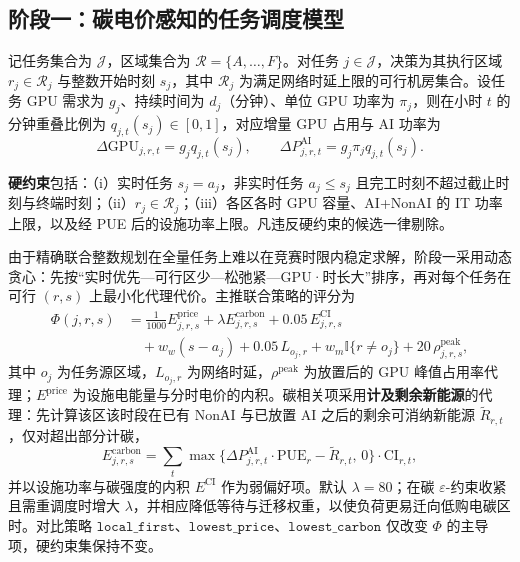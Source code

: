 \subsection{阶段一：碳电价感知的任务调度模型}

记任务集合为 \(\mathcal{J}\)，区域集合为 \(\mathcal{R}=\{A,\ldots,F\}\)。对任务 \(j\in\mathcal{J}\)，决策为其执行区域 \(r_j\in\mathcal{R}_j\) 与整数开始时刻 \(s_j\)，其中 \(\mathcal{R}_j\) 为满足网络时延上限的可行机房集合。设任务 GPU 需求为 \(g_j\)、持续时间为 \(d_j\)（分钟）、单位 GPU 功率为 \(\pi_j\)，则在小时 \(t\) 的分钟重叠比例为 \(q_{j,t}(s_j)\in[0,1]\)，对应增量 GPU 占用与 AI 功率为
\begin{equation}
\Delta\mathrm{GPU}_{j,r,t}
=
g_j q_{j,t}(s_j),\qquad
\Delta P^{\mathrm{AI}}_{j,r,t}
=
g_j\pi_j q_{j,t}(s_j).
\end{equation}

\textbf{硬约束}包括：（i）实时任务 \(s_j=a_j\)，非实时任务 \(a_j\le s_j\) 且完工时刻不超过截止时刻与终端时刻；（ii）\(r_j\in\mathcal{R}_j\)；（iii）各区各时 GPU 容量、AI+NonAI 的 IT 功率上限，以及经 PUE 后的设施功率上限。凡违反硬约束的候选一律剔除。

由于精确联合整数规划在全量任务上难以在竞赛时限内稳定求解，阶段一采用动态贪心：先按“实时优先—可行区少—松弛紧—GPU·时长大”排序，再对每个任务在可行 \((r,s)\) 上最小化代理代价。主推联合策略的评分为
\begin{equation}
\begin{aligned}
\Phi(j,r,s)
&=
\frac{1}{1000}E^{\mathrm{price}}_{j,r,s}
+
\lambda E^{\mathrm{carbon}}_{j,r,s}
+
0.05\,E^{\mathrm{CI}}_{j,r,s}
\\
&\quad
+
w_w(s-a_j)
+
0.05\,L_{o_j,r}
+
w_m\mathbb{I}\{r\neq o_j\}
+
20\,\rho^{\mathrm{peak}}_{j,r,s},
\end{aligned}
\end{equation}
其中 \(o_j\) 为任务源区域，\(L_{o_j,r}\) 为网络时延，\(\rho^{\mathrm{peak}}\) 为放置后的 GPU 峰值占用率代理；\(E^{\mathrm{price}}\) 为设施电能量与分时电价的内积。碳相关项采用\textbf{计及剩余新能源}的代理：先计算该区该时段在已有 NonAI 与已放置 AI 之后的剩余可消纳新能源 \(\widetilde{R}_{r,t}\)，仅对超出部分计碳，
\begin{equation}
E^{\mathrm{carbon}}_{j,r,s}
=
\sum_{t}
\max\bigl\{
\Delta P^{\mathrm{AI}}_{j,r,t}\cdot\mathrm{PUE}_r-\widetilde{R}_{r,t},\,0
\bigr\}
\cdot
\mathrm{CI}_{r,t},
\end{equation}
并以设施功率与碳强度的内积 \(E^{\mathrm{CI}}\) 作为弱偏好项。默认 \(\lambda=80\)；在碳 \(\varepsilon\)-约束收紧且需重调度时增大 \(\lambda\)，并相应降低等待与迁移权重，以使负荷更易迁向低购电碳区时。对比策略 \(\texttt{local\_first}\)、\(\texttt{lowest\_price}\)、\(\texttt{lowest\_carbon}\) 仅改变 \(\Phi\) 的主导项，硬约束集保持不变。

